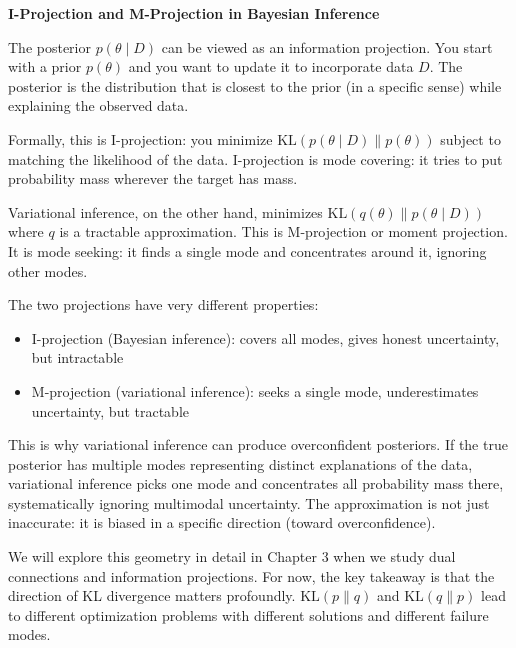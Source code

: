 \begin{geometrylens}
\textbf{I-Projection and M-Projection in Bayesian Inference}

\vspace{0.5em}

The posterior $p(\theta \mid D)$ can be viewed as an information projection. You start with a prior $p(\theta)$ and you want to update it to incorporate data $D$. The posterior is the distribution that is closest to the prior (in a specific sense) while explaining the observed data.

\vspace{0.5em}

Formally, this is I-projection: you minimize $\text{KL}(p(\theta \mid D) \| p(\theta))$ subject to matching the likelihood of the data. I-projection is mode covering: it tries to put probability mass wherever the target has mass.

\vspace{0.5em}

Variational inference, on the other hand, minimizes $\text{KL}(q(\theta) \| p(\theta \mid D))$ where $q$ is a tractable approximation. This is M-projection or moment projection. It is mode seeking: it finds a single mode and concentrates around it, ignoring other modes.

\vspace{0.5em}

The two projections have very different properties:

\begin{itemize}
\item I-projection (Bayesian inference): covers all modes, gives honest uncertainty, but intractable
\item M-projection (variational inference): seeks a single mode, underestimates uncertainty, but tractable
\end{itemize}

\vspace{0.5em}

This is why variational inference can produce overconfident posteriors. If the true posterior has multiple modes representing distinct explanations of the data, variational inference picks one mode and concentrates all probability mass there, systematically ignoring multimodal uncertainty. The approximation is not just inaccurate: it is biased in a specific direction (toward overconfidence).

\vspace{0.5em}

We will explore this geometry in detail in Chapter 3 when we study dual connections and information projections. For now, the key takeaway is that the direction of KL divergence matters profoundly. $\text{KL}(p \| q)$ and $\text{KL}(q \| p)$ lead to different optimization problems with different solutions and different failure modes.
\end{geometrylens}

